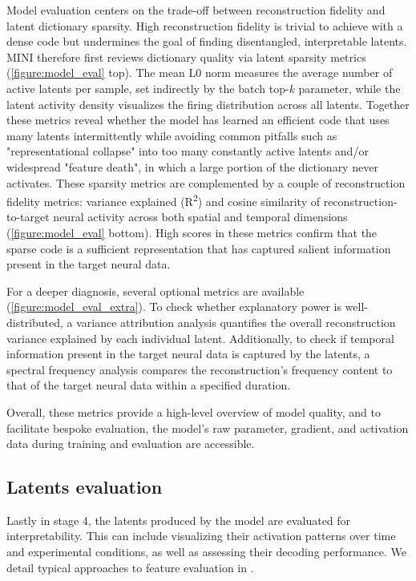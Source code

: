Model evaluation centers on the trade-off between reconstruction fidelity and latent dictionary sparsity. High reconstruction fidelity is trivial to achieve with a dense code but undermines the goal of finding disentangled, interpretable latents. MINI therefore first reviews dictionary quality via latent sparsity metrics (\autoref{figure:model_eval} top). The mean L0 norm measures the average number of active latents per sample, set indirectly by the batch top-$k$ parameter, while the latent activity density visualizes the firing distribution across all latents. Together these metrics reveal whether the model has learned an efficient code that uses many latents intermittently while avoiding common pitfalls such as "representational collapse" into too many constantly active latents and/or widespread "feature death", in which a large portion of the dictionary never activates. These sparsity metrics are complemented by a couple of reconstruction fidelity metrics: variance explained (R\textsuperscript{2}) and cosine similarity of reconstruction-to-target neural activity across both spatial and temporal dimensions (\autoref{figure:model_eval} bottom). High scores in these metrics confirm that the sparse code is a sufficient representation that has captured salient information present in the target neural data.

For a deeper diagnosis, several optional metrics are available (\autoref{figure:model_eval_extra}). To check whether explanatory power is well-distributed, a variance attribution analysis quantifies the overall reconstruction variance explained by each individual latent. Additionally, to check if temporal information present in the target neural data is captured by the latents, a spectral frequency analysis compares the reconstruction's frequency content to that of the target neural data within a specified duration. 

Overall, these metrics provide a high-level overview of model quality, and to facilitate bespoke evaluation, the model's raw parameter, gradient, and activation data during training and evaluation are accessible.

\subsection{Latents evaluation}

Lastly in stage 4, the latents produced by the model are evaluated for interpretability. This can include visualizing their activation patterns over time and experimental conditions, as well as assessing their decoding performance. We detail typical approaches to feature evaluation in .
